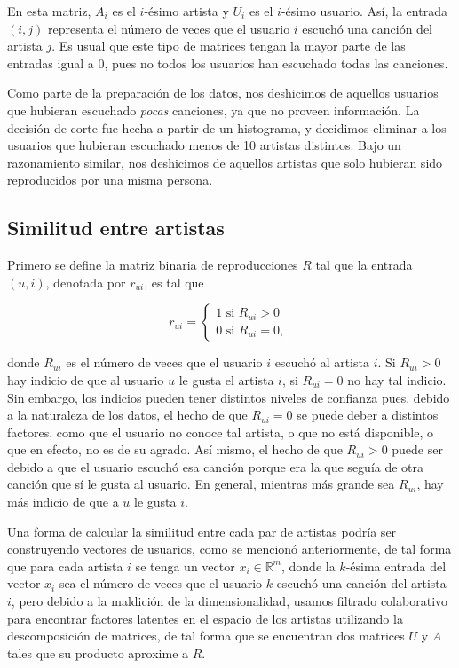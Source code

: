 \documentclass[conference]{IEEEtran}
\begin{document}
En esta matriz, $A_i$ es el $i$-ésimo artista y $U_i$ es el $i$-ésimo usuario. Así, la entrada $(i, j)$ representa el número de veces que el usuario $i$ escuchó una canción del artista $j$. Es usual que este tipo de matrices tengan la mayor parte de las entradas igual a $0$, pues no todos los usuarios han escuchado todas las canciones.

Como parte de la preparación de los datos, nos deshicimos de aquellos usuarios que hubieran escuchado \textit{pocas} canciones, ya que no proveen información. La decisión de corte fue hecha a partir de un histograma, y decidimos eliminar a los usuarios que hubieran escuchado menos de 10 artistas distintos. Bajo un razonamiento similar, nos deshicimos de aquellos artistas que solo hubieran sido reproducidos por una misma persona.

\subsection{Similitud entre artistas}

Primero se define la matriz binaria de reproducciones $R$ tal que la entrada $(u, i)$, denotada por $r_{ui}$, es tal que 

\[   
r_{ui} = 
     \begin{cases}
       1 \text{ si } R_{ui} > 0 \\
       0 \text{ si } R_{ui} = 0, \
     \end{cases}
\]

donde $R_{ui}$ es el número de veces que el usuario $i$ escuchó al artista $i$. Si $R_{ui} > 0$ hay indicio de que al usuario $u$ le gusta el artista $i$, si $R_{ui} = 0$ no hay tal indicio. Sin embargo, los indicios pueden tener distintos niveles de confianza pues, debido a la naturaleza de los datos, el hecho de que $R_{ui} = 0$ se puede deber a distintos factores, como que el usuario no conoce tal artista, o que no está disponible, o que en efecto, no es de su agrado. Así mismo, el hecho de que $R_{ui} > 0$ puede ser debido a que el usuario escuchó esa canción porque era la que seguía de otra canción que sí le gusta al usuario. En general, mientras más grande sea $R_{ui}$, hay más indicio de que a $u$ le gusta $i$.

Una forma de calcular la similitud entre cada par de artistas podría ser construyendo vectores de usuarios, como se mencionó anteriormente, de tal forma que para cada artista $i$ se tenga un vector $x_i \in \mathbb{R}^m$, donde la $k$-ésima entrada del vector $x_i$ sea el número de veces que el usuario $k$ escuchó una canción del artista $i$, pero debido a la maldición de la dimensionalidad, usamos filtrado colaborativo para encontrar factores latentes en el espacio de los artistas utilizando la descomposición de matrices, de tal forma que se encuentran dos matrices $U$ y $A$ tales que su producto aproxime a $R$.
\end{document}
